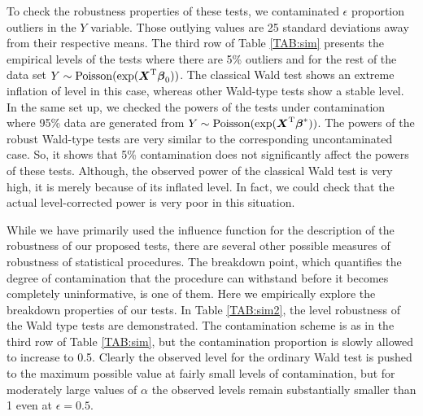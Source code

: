 \documentclass[a4paper]{article}%
\begin{document}
To check the robustness properties of these tests, we contaminated $\epsilon$ proportion outliers in the $Y$ variable. 
Those outlying values are  25 standard deviations away from their respective means. 
The third row of Table \ref{TAB:sim} presents the empirical levels of the tests where there are 5\% outliers 
and for the rest of the data set  $Y \sim \rm{Poisson}(exp(\boldsymbol{X}^T \boldsymbol{\beta}_0))$. 
The classical Wald test shows an extreme inflation of level in this case, whereas other Wald-type tests show a stable level. 
In the same set up, we checked the powers of the tests under contamination where 95\% data are generated from  
$Y \sim \rm{Poisson}(exp(\boldsymbol{X}^T \boldsymbol{\beta}^*))$. 
The powers of the robust Wald-type tests are very similar to the corresponding uncontaminated case. 
So, it shows that 5\% contamination does not significantly affect the powers of these tests. 
Although, the observed power of the classical Wald test is very high, it is merely because of its inflated level. 
In fact, we could check that the actual level-corrected power is very poor in this situation. 






While we have primarily used the influence function for the description of the robustness of our proposed tests, 
there are several other possible measures of robustness of statistical procedures. 
The breakdown point, which quantifies the degree of contamination that the procedure can withstand before it becomes completely uninformative, is one of them. 
Here we empirically explore the breakdown properties of our tests. 
In Table \ref{TAB:sim2}, the level robustness of the Wald type tests are demonstrated. 
The contamination scheme is as in the third row of Table \ref{TAB:sim}, but the contamination proportion is slowly allowed to increase to 0.5. 
Clearly the observed level for the ordinary Wald test is pushed to the maximum possible value at fairly small levels of contamination, 
but for moderately large values of $\alpha$ the observed levels remain substantially smaller than 1 even at $\epsilon = 0.5$.  
\end{document}
